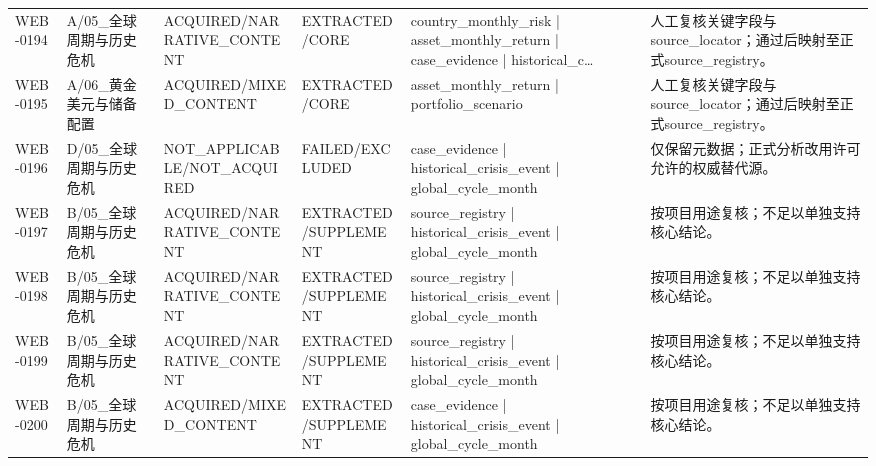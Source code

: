 \begin{landscape}
\begin{longtable}{p{1.8cm}p{2.6cm}p{2.6cm}p{2.6cm}p{4.8cm}p{7.2cm}}
WEB-0194 & A/\allowbreak{}05\_\allowbreak{}全球周期与历史危机 & ACQUIRED/\allowbreak{}NARRATIVE\_\allowbreak{}CONTENT & EXTRACTED/\allowbreak{}CORE & country\_\allowbreak{}monthly\_\allowbreak{}risk | asset\_\allowbreak{}monthly\_\allowbreak{}return | case\_\allowbreak{}evidence | historical\_\allowbreak{}c… & 人工复核关键字段与source\_\allowbreak{}locator；通过后映射至正式source\_\allowbreak{}registry。\\
WEB-0195 & A/\allowbreak{}06\_\allowbreak{}黄金美元与储备配置 & ACQUIRED/\allowbreak{}MIXED\_\allowbreak{}CONTENT & EXTRACTED/\allowbreak{}CORE & asset\_\allowbreak{}monthly\_\allowbreak{}return | portfolio\_\allowbreak{}scenario & 人工复核关键字段与source\_\allowbreak{}locator；通过后映射至正式source\_\allowbreak{}registry。\\
WEB-0196 & D/\allowbreak{}05\_\allowbreak{}全球周期与历史危机 & NOT\_\allowbreak{}APPLICABLE/\allowbreak{}NOT\_\allowbreak{}ACQUIRED & FAILED/\allowbreak{}EXCLUDED & case\_\allowbreak{}evidence | historical\_\allowbreak{}crisis\_\allowbreak{}event | global\_\allowbreak{}cycle\_\allowbreak{}month & 仅保留元数据；正式分析改用许可允许的权威替代源。\\
WEB-0197 & B/\allowbreak{}05\_\allowbreak{}全球周期与历史危机 & ACQUIRED/\allowbreak{}NARRATIVE\_\allowbreak{}CONTENT & EXTRACTED/\allowbreak{}SUPPLEMENT & source\_\allowbreak{}registry | historical\_\allowbreak{}crisis\_\allowbreak{}event | global\_\allowbreak{}cycle\_\allowbreak{}month & 按项目用途复核；不足以单独支持核心结论。\\
WEB-0198 & B/\allowbreak{}05\_\allowbreak{}全球周期与历史危机 & ACQUIRED/\allowbreak{}NARRATIVE\_\allowbreak{}CONTENT & EXTRACTED/\allowbreak{}SUPPLEMENT & source\_\allowbreak{}registry | historical\_\allowbreak{}crisis\_\allowbreak{}event | global\_\allowbreak{}cycle\_\allowbreak{}month & 按项目用途复核；不足以单独支持核心结论。\\
WEB-0199 & B/\allowbreak{}05\_\allowbreak{}全球周期与历史危机 & ACQUIRED/\allowbreak{}NARRATIVE\_\allowbreak{}CONTENT & EXTRACTED/\allowbreak{}SUPPLEMENT & source\_\allowbreak{}registry | historical\_\allowbreak{}crisis\_\allowbreak{}event | global\_\allowbreak{}cycle\_\allowbreak{}month & 按项目用途复核；不足以单独支持核心结论。\\
WEB-0200 & B/\allowbreak{}05\_\allowbreak{}全球周期与历史危机 & ACQUIRED/\allowbreak{}MIXED\_\allowbreak{}CONTENT & EXTRACTED/\allowbreak{}SUPPLEMENT & case\_\allowbreak{}evidence | historical\_\allowbreak{}crisis\_\allowbreak{}event | global\_\allowbreak{}cycle\_\allowbreak{}month & 按项目用途复核；不足以单独支持核心结论。\\

\end{longtable}
\end{landscape}
